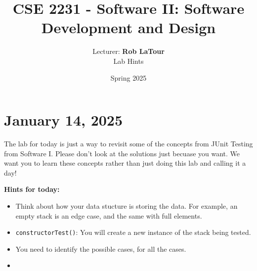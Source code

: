 \documentclass[11pt]{article}
\title{CSE 2231 - Software II: Software Development and Design}
\author{Lecturer: \textbf{Rob LaTour}\\Lab Hints}
\date{Spring 2025}
\begin{document}
\maketitle


\section{January 14, 2025}
The lab for today is just a way to revisit some of the concepts from JUnit
Testing from Software I. Please don't look at the solutions just becuase you
want. We want you to learn these concepts rather than just doing this lab and
calling it a day!

\textbf{Hints for today:}
\begin{itemize}
    \item Think about how your data stucture is storing the data. For example, an empty
          stack is an edge case, and the same with full elements.
    \item \texttt{constructorTest()}: You will create a new instance of the stack being tested.
    \item You need to identify the possible cases, for all the cases.
    \item
\end{itemize}
\end{document}
